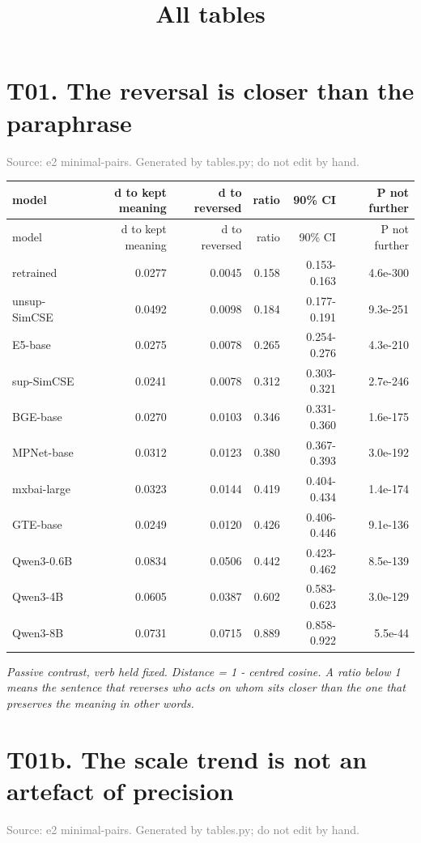 \documentclass[10pt]{article}
\title{\vspace{-14mm}All tables}
\date{}
\begin{document}
\maketitle

\tableofcontents
\clearpage
\section*{T01. The reversal is closer than the paraphrase}
\textcolor{gray}{Source: e2 minimal-pairs. Generated by tables.py; do not edit by hand.}

\footnotesize
\begin{longtable}{lrrrrr}
\toprule
model & d to kept meaning & d to reversed & ratio & 90\% CI & P not further \\
\midrule
\endfirsthead
\toprule
model & d to kept meaning & d to reversed & ratio & 90\% CI & P not further \\
\midrule
\endhead
\bottomrule
\endfoot
retrained & 0.0277 & 0.0045 & 0.158 & 0.153-0.163 & 4.6e-300 \\
unsup-SimCSE & 0.0492 & 0.0098 & 0.184 & 0.177-0.191 & 9.3e-251 \\
E5-base & 0.0275 & 0.0078 & 0.265 & 0.254-0.276 & 4.3e-210 \\
sup-SimCSE & 0.0241 & 0.0078 & 0.312 & 0.303-0.321 & 2.7e-246 \\
BGE-base & 0.0270 & 0.0103 & 0.346 & 0.331-0.360 & 1.6e-175 \\
MPNet-base & 0.0312 & 0.0123 & 0.380 & 0.367-0.393 & 3.0e-192 \\
mxbai-large & 0.0323 & 0.0144 & 0.419 & 0.404-0.434 & 1.4e-174 \\
GTE-base & 0.0249 & 0.0120 & 0.426 & 0.406-0.446 & 9.1e-136 \\
Qwen3-0.6B & 0.0834 & 0.0506 & 0.442 & 0.423-0.462 & 8.5e-139 \\
Qwen3-4B & 0.0605 & 0.0387 & 0.602 & 0.583-0.623 & 3.0e-129 \\
Qwen3-8B & 0.0731 & 0.0715 & 0.889 & 0.858-0.922 & 5.5e-44 \\
\end{longtable}
\normalsize

\textit{Passive contrast, verb held fixed. Distance = 1 - centred cosine. A ratio below 1 means the sentence that reverses who acts on whom sits closer than the one that preserves the meaning in other words.}
\clearpage

\section*{T01b. The scale trend is not an artefact of precision}
\textcolor{gray}{Source: e2 minimal-pairs. Generated by tables.py; do not edit by hand.}
\end{document}

